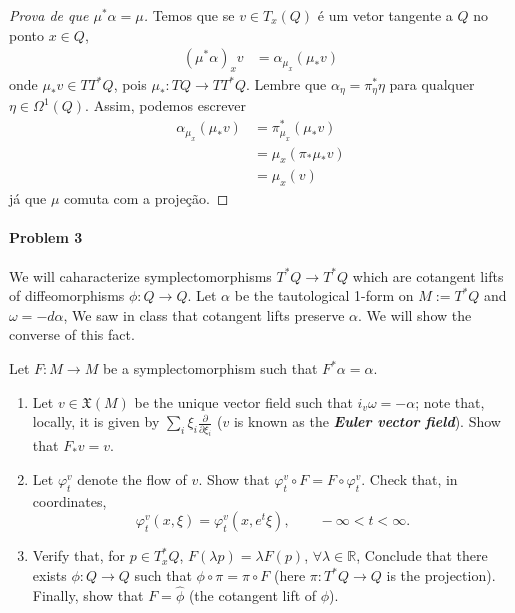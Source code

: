 \begin{proof}[Prova de que $\mu^*\alpha=\mu$]\leavevmode
	Temos que se $v\in T_x(Q)$ \'e um vetor tangente a $Q$ no ponto $x\in Q$,
	\begin{align*}
		(\mu^*\alpha)_xv&=\alpha_{\mu_x}(\mu_*v)
	\end{align*}
	onde $\mu_*v\in T T^*Q$, pois $\mu_*:TQ\to  T T^*Q$. Lembre que $\alpha_\eta=\pi^*_{\eta}\eta$ para qualquer $\eta\in\Omega^{1}(Q)$. Assim, podemos escrever
	\begin{align*}
		\alpha_{\mu_x}(\mu_*v)&=\pi_{\mu_x}^*(\mu_{*}v)\\
		& =\mu_x(\pi_{*}\mu_*v)\\
		&=\mu_x(v)
	\end{align*}
	j\'a que $\mu$ comuta com a proje\c c\~ao.
\end{proof}

\paragraph{Problem 3} We will caharacterize symplectomorphisms $T^*Q\to T^*Q$ which are cotangent lifts of diffeomorphisms $\phi:Q\to Q$. Let $\alpha$ be the tautological 1-form on $M:=T^*Q$ and $\omega=-d\alpha$, We saw in class that cotangent lifts preserve  $\alpha$. We will show the converse of this fact.

Let  $F:M\to M$ be a symplectomorphism such that $F^*\alpha=\alpha$.
\begin{enumerate}[label=\alph*.]
	\item Let $v\in\mathfrak{X}(M)$ be the unique vector field such that $i_v\omega=-\alpha$; note that, locally, it is given by $\sum_{i}\xi_i\frac{\partial }{\partial \xi_i}$ ($v$ is known as the \textit{\textbf{Euler vector field}}). Show that $F_*v=v$.

	\item Let $\varphi_t^v$ denote the flow of $v$. Show that $\varphi_t^v\circ F=F\circ \varphi_t^v$. Check that, in coordinates,
		\[\varphi_t^v(x,\xi)=\varphi_t^v(x,e^t\xi),\qquad -\infty<t<\infty.\]

	\item Verify that, for $p\in T_x^*Q$, $F(\lambda p)=\lambda F(p)$, $\forall \lambda\in\mathbb{R}$, Conclude that there exists $\phi:Q\to Q$ such that $\phi\circ \pi=\pi\circ F$ (here $\pi:T^*Q\to Q$ is the projection). Finally, show that $F=\hat{\phi}$ (the cotangent lift of $\phi$).
\end{enumerate}


